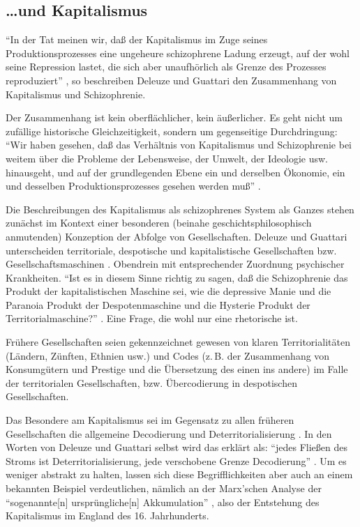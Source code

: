 \documentclass[12pt,
               DIV13,
               paper=a4,
               twoside=false,
               onehalfspacing,
               bibliography=totoc,
               toc=graduated,
               draft,
               ]{scrartcl}
\newcommand{\pc}[2]{\parencite[#1]{#2}}
\newcommand{\vgl}[2]{\parencite[vgl.][#1]{#2}}
\newcommand{\worries}[1]{\ifdraft{\textcolor{blue}{\texttt{(#1)}}}{}}
\newcommand{\dg}{Deleuze und Guattari\xspace}
\begin{document}


\subsection{\dots und Kapitalismus}

"`In der Tat meinen wir, daß der Kapitalismus im Zuge seines
Produktionsprozesses eine ungeheure schizophrene Ladung erzeugt, auf
der wohl seine Repression lastet, die sich aber unaufhörlich als
Grenze des Prozesses reproduziert"' \pc{45}{ao}, so beschreiben
Deleuze und Guattari den Zusammenhang von Kapitalismus und
Schizophrenie.

Der Zusammenhang ist kein oberflächlicher, kein äußerlicher. Es geht
nicht um zufällige historische Gleichzeitigkeit, sondern um
gegenseitige Durchdringung: "`Wir haben gesehen, daß das Verhältnis
von Kapitalismus und Schizophrenie bei weitem über die Probleme der
Lebensweise, der Umwelt, der Ideologie usw. hinausgeht, und auf der
grundlegenden Ebene ein und derselben Ökonomie, ein und desselben
Produktionsprozesses gesehen werden muß"' \pc{315}{ao}.

Die Beschreibungen des Kapitalismus als schizophrenes System als
Ganzes stehen zunächst im Kontext einer besonderen (beinahe
geschichtsphilosophisch anmutenden) Konzeption der Abfolge von
Gesellschaften. Deleuze und Guattari unterscheiden territoriale,
despotische und kapitalistische Gesellschaften bzw.
Gesellschaftsmaschinen \vgl{338}{ao}. Obendrein mit entsprechender
Zuordnung psychischer Krankheiten. "`Ist es in diesem Sinne richtig zu
sagen, daß die Schizophrenie das Produkt der kapitalistischen Maschine
sei, wie die depressive Manie und die Paranoia Produkt der
Despotenmaschine und die Hysterie Produkt der Territorialmaschine?"'
\pc{44}{ao}. Eine Frage, die wohl nur eine rhetorische ist.

Frühere Gesellschaften seien gekennzeichnet gewesen von klaren
Territorialitäten (Ländern, Zünften, Ethnien usw.) und Codes (z.\,B.
der Zusammenhang von Konsumgütern und Prestige und die Übersetzung des
einen ins andere) \vgl{318, 332}{ao} im Falle der territorialen
Gesellschaften, bzw. Übercodierung \worries{BSP} in despotischen
Gesellschaften.

Das Besondere am Kapitalismus sei im Gegensatz zu allen früheren
Gesellschaften die allgemeine Decodierung und Deterritorialisierung
\vgl{337}{ao}. In den Worten von \dg selbst wird das erklärt als:
"`jedes Fließen des Stroms ist Deterritorialisierung, jede verschobene
Grenze Decodierung"' \pc{298}{ao}. Um es weniger abstrakt zu halten,
lassen sich diese Begrifflichkeiten aber auch an einem bekannten
Beispiel verdeutlichen, nämlich an der Marx'schen Analyse der
"`sogenannte[n] ursprüngliche[n] Akkumulation"' \pc{741}{kap}, also
der Entstehung des Kapitalismus im England des 16. Jahrhunderts.
\end{document}
